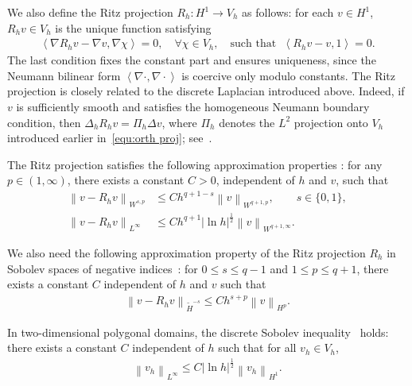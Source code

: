 \documentclass[11pt, reqno]{amsart}
\theoremstyle{definition}
\numberwithin{equation}{section}
\newcommand{\bb}{\mathbb}
\newcommand{\norm}[2]{\left\|{#1}\right\|_{#2}}
\newcommand{\inpro}[2]{\left\langle#1,#2\right\rangle}
\newcommand{\abs}[1]{\left|{#1}\right|}
\begin{document}
We also define the Ritz projection $R_h:H^1\to V_h$ as follows: for each
$v\in H^1$, $R_h v\in V_h$ is the unique function satisfying
\begin{align}\label{equ:Ritz}
	\inpro{\nabla R_h v- \nabla v}{\nabla \chi}=0,
	\quad
	\forall \chi\in V_h, \quad \text{such that }\; \inpro{R_h v-v}{1}=0.
\end{align}
The last condition fixes the constant part and ensures uniqueness, since the
Neumann bilinear form $\inpro{\nabla \cdot}{\nabla \cdot}$ is coercive only
modulo constants. The Ritz projection is closely related to the discrete Laplacian introduced
above. Indeed, if $v$ is sufficiently smooth and satisfies the homogeneous
Neumann boundary condition, then $\Delta_h R_h v=\Pi_h\Delta v$, where $\Pi_h$ denotes the $L^2$ projection onto $V_h$ introduced earlier in~\eqref{equ:orth proj}; see~\cite[Chapter~1]{Tho06}.

The Ritz projection satisfies the following approximation properties
\cite{BreSco08,LeyLi21,LinThoWah91,RanSco82}: for any $p\in(1,\infty)$, there
exists a constant $C>0$, independent of $h$ and $v$, such that
\begin{align}\label{equ:Ritz ineq}
	\norm{v-R_h v}{W^{s,p}}
	&\leq
	C h^{q+1-s} \norm{v}{W^{q+1,p}},
	\qquad  s\in \{0,1\},
	\\
	\label{equ:Ritz infty}
	\norm{v-R_h v}{L^\infty}
	&\leq
	Ch^{q+1} \abs{\ln h}^{\frac12}
	\norm{v}{W^{q+1,\infty}} .
\end{align}



We also need the following approximation property of the Ritz projection $R_h$ in Sobolev spaces of negative indices~\cite{CheMaoShe20, Tho06}: for $0\leq s\leq q-1$ and $1\leq p\leq q+1$, there exists a constant $C$ independent of $h$ and $v$ such that
\begin{align}\label{equ:Ritz approx neg}
	{\norm{v-R_h v}{\widetilde{H}^{-s}}} 
	\leq Ch^{s+p} \norm{v}{H^p}.
\end{align}

In two-dimensional polygonal domains, the discrete Sobolev inequality~\cite{BreSco08} holds: there exists a constant $C$ independent of $h$ such that for all $v_h\in V_h$,
\begin{align}\label{equ:disc sob 2d}
    \norm{v_h}{L^\infty} \leq C \abs{\ln h}^{\frac12} \norm{v_h}{H^1}.
\end{align}
\end{document}
